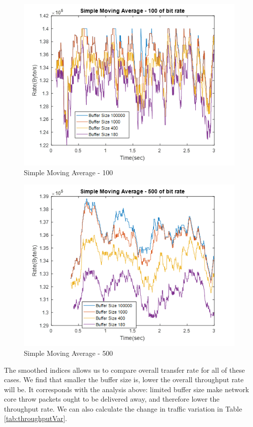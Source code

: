 \documentclass[a4paper]{article}
\begin{document}
\begin{figure}
\centering
\includegraphics[width=1\textwidth]{SMA100.png}
\caption{\label{fig:SMA100}Simple Moving Average - 100 }
\end{figure}

\begin{figure}
\centering
\includegraphics[width=1\textwidth]{SMA500.png}
\caption{\label{fig:SMA500}Simple Moving Average - 500 }
\end{figure}
	
The smoothed indices allows us to compare overall transfer rate for all of these cases. We find that smaller the buffer size is, lower the overall throughput rate will be. It corresponds with the analysis above: limited buffer size make network core throw packets ought to be delivered away, and therefore lower the throughput rate. We can also calculate the change in traffic variation in Table \ref{tab:throughputVar}.
\end{document}
